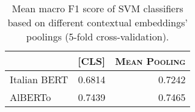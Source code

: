 \begin{table}
\centering
    \begin{tabular}{lrr}
        \toprule
        & \textsc{[CLS]} & \textsc{Mean Pooling} \\
        \midrule
        Italian BERT & 0.6814 & 0.7242 \\
        AlBERTo & 0.7439 & 0.7465 \\
        \bottomrule
    \end{tabular}
    \caption{Mean macro F1 score of SVM classifiers based on different contextual embeddings' poolings (5-fold cross-validation).}
    \label{tbl:svm_f1_contextual_embs_pooling}
\end{table}
